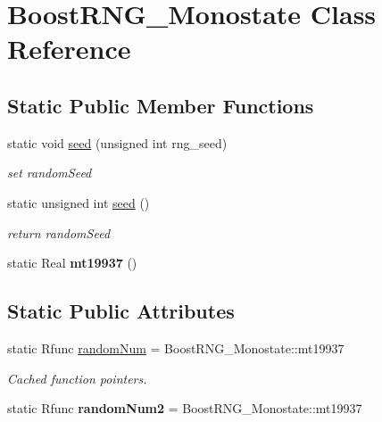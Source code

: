 \section{Boost\+R\+N\+G\+\_\+\+Monostate Class Reference}
\label{classPecos_1_1BoostRNG__Monostate}
\subsection*{Static Public Member Functions}
\begin{DoxyCompactItemize}
\item 
static void \hyperlink{classPecos_1_1BoostRNG__Monostate_a30a665dc3d2e81cf2110f6a362f10481}{seed} (unsigned int rng\+\_\+seed)\label{classPecos_1_1BoostRNG__Monostate_a30a665dc3d2e81cf2110f6a362f10481}

\begin{DoxyCompactList}\small\item\em set random\+Seed \end{DoxyCompactList}\item 
static unsigned int \hyperlink{classPecos_1_1BoostRNG__Monostate_a38dd7ac12fd0a21d3e5e940c193c62fa}{seed} ()\label{classPecos_1_1BoostRNG__Monostate_a38dd7ac12fd0a21d3e5e940c193c62fa}

\begin{DoxyCompactList}\small\item\em return random\+Seed \end{DoxyCompactList}\item 
static Real {\bfseries mt19937} ()\label{classPecos_1_1BoostRNG__Monostate_a310d5b8210e26a75ac903d05a8810df6}

\end{DoxyCompactItemize}
\subsection*{Static Public Attributes}
\begin{DoxyCompactItemize}
\item 
static Rfunc \hyperlink{classPecos_1_1BoostRNG__Monostate_a471db23ae67e284b64b62724ee6e5fd6}{random\+Num} = Boost\+R\+N\+G\+\_\+\+Monostate\+::mt19937\label{classPecos_1_1BoostRNG__Monostate_a471db23ae67e284b64b62724ee6e5fd6}

\begin{DoxyCompactList}\small\item\em Cached function pointers. \end{DoxyCompactList}\item 
static Rfunc {\bfseries random\+Num2} = Boost\+R\+N\+G\+\_\+\+Monostate\+::mt19937\label{classPecos_1_1BoostRNG__Monostate_af70eaa38bec1d222adab06c337805431}

\end{DoxyCompactItemize}
